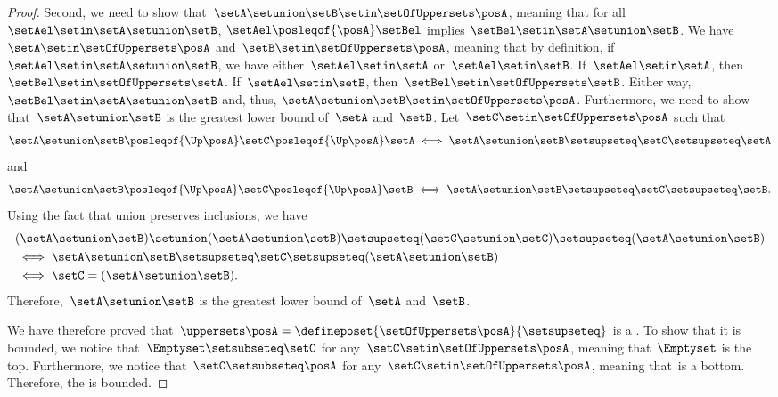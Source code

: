 \begin{proof}
    Second, we need to show that~$\setA\setunion \setB\setin \setOfUppersets \posA$, meaning that for all $\setAel \setin \setA\setunion\setB$, $\setAel \posleqof{\posA} \setBel$ implies $\setBel \setin \setA\setunion\setB$.
    We have~$\setA \setin \setOfUppersets \posA$ and~$\setB \setin \setOfUppersets \posA$, meaning that by definition, if~$\setAel\setin \setA\setunion \setB$, we have either~$\setAel\setin \setA$ or~$\setAel\setin \setB$.
    If~$\setAel\setin \setA$, then~$\setBel\setin \setOfUppersets \setA$.
    If~$\setAel\setin \setB$, then~$\setBel \setin \setOfUppersets \setB$. Either way, $\setBel \setin \setA\setunion\setB$ and, thus, $\setA \setunion \setB \setin \setOfUppersets\posA$.
    Furthermore, we need to show that~$\setA\setunion \setB$ is the greatest lower bound of~$\setA$ and~$\setB$.
    Let~$\setC\setin \setOfUppersets \posA$ such that
\[
\setA\setunion \setB\posleqof{\Up \posA} \setC \posleqof{\Up \posA} \setA
\iff    
\setA\setunion \setB\setsupseteq \setC\setsupseteq \setA
\]
and
\[
\setA\setunion \setB\posleqof{\Up \posA} \setC \posleqof{\Up \posA} \setB
\iff    
\setA\setunion \setB\setsupseteq \setC\setsupseteq \setB.
\]
    Using the fact that union preserves inclusions, we have
    \begin{equation*}
        \begin{aligned}
            &(\setA\setunion \setB)
            \setunion (\setA\setunion \setB)  \setsupseteq (\setC \setunion \setC) \setsupseteq (\setA\setunion \setB) \\
            &\iff\setA\setunion \setB              \setsupseteq \setC\setsupseteq (\setA\setunion \setB ) \\
            &\iff\setC                             =(\setA\setunion \setB).
        \end{aligned}
    \end{equation*}
    Therefore,~$\setA\setunion \setB$ is the greatest lower bound of~$\setA$ and~$\setB$.

    We have therefore proved that~$\uppersets \posA=\defineposet{\setOfUppersets \posA}{\setsupseteq}$ is a .
    To show that it is bounded, we notice that~$\Emptyset \setsubseteq \setC$ for any~$\setC\setin \setOfUppersets \posA$, meaning that~$\Emptyset$ is the top.
    Furthermore, we notice that~$\setC\setsubseteq \posA$ for any~$\setC\setin \setOfUppersets \posA$, meaning that~\posA is a bottom.
    Therefore, the  is bounded.
\end{proof}


